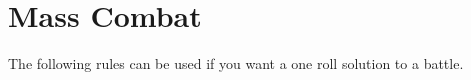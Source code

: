










\section{Mass Combat}
The following rules can be used if you want a one roll solution to a battle.

